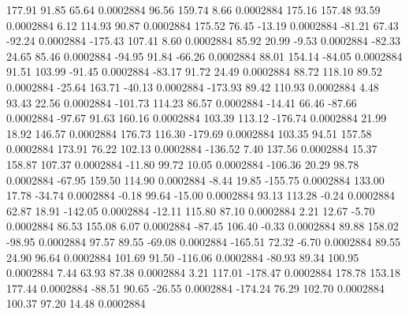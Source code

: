       177.91       91.85       65.64     0.0002884
       96.56      159.74        8.66     0.0002884
      175.16      157.48       93.59     0.0002884
        6.12      114.93       90.87     0.0002884
      175.52       76.45      -13.19     0.0002884
      -81.21       67.43      -92.24     0.0002884
     -175.43      107.41        8.60     0.0002884
       85.92       20.99       -9.53     0.0002884
      -82.33       24.65       85.46     0.0002884
      -94.95       91.84      -66.26     0.0002884
       88.01      154.14      -84.05     0.0002884
       91.51      103.99      -91.45     0.0002884
      -83.17       91.72       24.49     0.0002884
       88.72      118.10       89.52     0.0002884
      -25.64      163.71      -40.13     0.0002884
     -173.93       89.42      110.93     0.0002884
        4.48       93.43       22.56     0.0002884
     -101.73      114.23       86.57     0.0002884
      -14.41       66.46      -87.66     0.0002884
      -97.67       91.63      160.16     0.0002884
      103.39      113.12     -176.74     0.0002884
       21.99       18.92      146.57     0.0002884
      176.73      116.30     -179.69     0.0002884
      103.35       94.51      157.58     0.0002884
      173.91       76.22      102.13     0.0002884
     -136.52        7.40      137.56     0.0002884
       15.37      158.87      107.37     0.0002884
      -11.80       99.72       10.05     0.0002884
     -106.36       20.29       98.78     0.0002884
      -67.95      159.50      114.90     0.0002884
       -8.44       19.85     -155.75     0.0002884
      133.00       17.78      -34.74     0.0002884
       -0.18       99.64      -15.00     0.0002884
       93.13      113.28       -0.24     0.0002884
       62.87       18.91     -142.05     0.0002884
      -12.11      115.80       87.10     0.0002884
        2.21       12.67       -5.70     0.0002884
       86.53      155.08        6.07     0.0002884
      -87.45      106.40       -0.33     0.0002884
       89.88      158.02      -98.95     0.0002884
       97.57       89.55      -69.08     0.0002884
     -165.51       72.32       -6.70     0.0002884
       89.55       24.90       96.64     0.0002884
      101.69       91.50     -116.06     0.0002884
      -80.93       89.34      100.95     0.0002884
        7.44       63.93       87.38     0.0002884
        3.21      117.01     -178.47     0.0002884
      178.78      153.18      177.44     0.0002884
      -88.51       90.65      -26.55     0.0002884
     -174.24       76.29      102.70     0.0002884
      100.37       97.20       14.48     0.0002884
